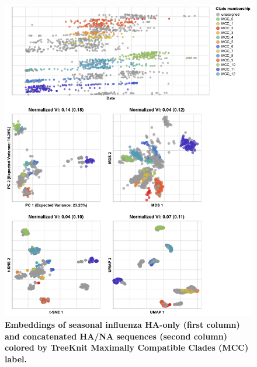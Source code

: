 \documentclass[10pt,letterpaper]{article}
\begin{document}
\begin{figure}[!h]
\includegraphics[width=\columnwidth]{figures/flu-2016-2018-ha-na-embeddings-by-mcc.png}
\caption{{\bf Embeddings of seasonal influenza HA-only (first column) and concatenated HA/NA sequences (second column) colored by TreeKnit Maximally Compatible Clades (MCC) label.}
}
\label{fig:seasonal-influenza-h3n2-ha-na-2016-2018-embeddings}
\end{figure}
\end{document}
